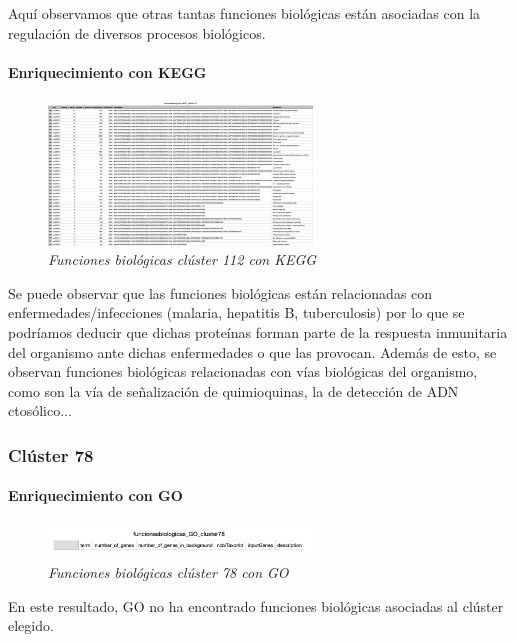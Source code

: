 Aquí observamos que otras tantas funciones biológicas están asociadas con la regulación de diversos procesos biológicos.

\paragraph{Enriquecimiento con KEGG}

\begin{figure}
	\centering
	\includegraphics[width=70mm,scale=1.2]{figures/cluster112_KEGG.png}
	\caption{\textit{Funciones biológicas clúster 112 con KEGG}}
\end{figure}

Se puede observar que las funciones biológicas están relacionadas con enfermedades/infecciones (malaria, hepatitis B, tuberculosis) por lo que se podríamos deducir que dichas proteínas forman parte de la respuesta inmunitaria del organismo ante dichas enfermedades o que las provocan.
Además de esto, se observan funciones biológicas relacionadas con vías biológicas del organismo, como son la vía de señalización de quimioquinas, la de detección de ADN ctosólico...

\subsubsection{Clúster 78}

\paragraph{Enriquecimiento con GO}

\begin{figure}
	\centering
	\includegraphics[width=70mm,scale=1.2]{figures/cluster78_GO.png}
	\caption{\textit{Funciones biológicas clúster 78 con GO}}
\end{figure}

En este resultado, GO no ha encontrado funciones biológicas asociadas al clúster elegido.

